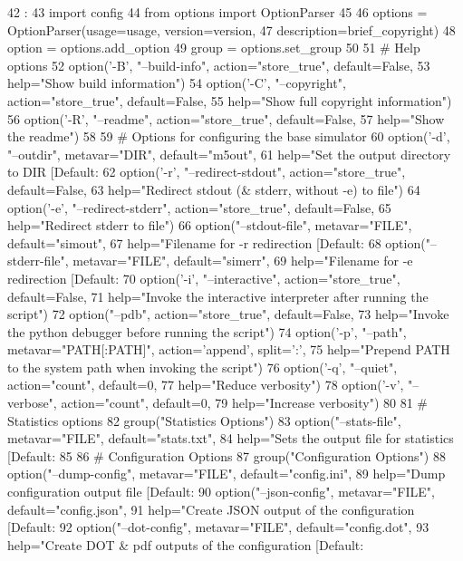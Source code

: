 \begin{DoxyCode}
42                    :
43     import config
44     from options import OptionParser
45 
46     options = OptionParser(usage=usage, version=version,
47                            description=brief_copyright)
48     option = options.add_option
49     group = options.set_group
50 
51     # Help options
52     option('-B', "--build-info", action="store_true", default=False,
53         help="Show build information")
54     option('-C', "--copyright", action="store_true", default=False,
55         help="Show full copyright information")
56     option('-R', "--readme", action="store_true", default=False,
57         help="Show the readme")
58 
59     # Options for configuring the base simulator
60     option('-d', "--outdir", metavar="DIR", default="m5out",
61         help="Set the output directory to DIR [Default: %
62     option('-r', "--redirect-stdout", action="store_true", default=False,
63         help="Redirect stdout (& stderr, without -e) to file")
64     option('-e', "--redirect-stderr", action="store_true", default=False,
65         help="Redirect stderr to file")
66     option("--stdout-file", metavar="FILE", default="simout",
67         help="Filename for -r redirection [Default: %
68     option("--stderr-file", metavar="FILE", default="simerr",
69         help="Filename for -e redirection [Default: %
70     option('-i', "--interactive", action="store_true", default=False,
71         help="Invoke the interactive interpreter after running the script")
72     option("--pdb", action="store_true", default=False,
73         help="Invoke the python debugger before running the script")
74     option('-p', "--path", metavar="PATH[:PATH]", action='append', split=':',
75         help="Prepend PATH to the system path when invoking the script")
76     option('-q', "--quiet", action="count", default=0,
77         help="Reduce verbosity")
78     option('-v', "--verbose", action="count", default=0,
79         help="Increase verbosity")
80 
81     # Statistics options
82     group("Statistics Options")
83     option("--stats-file", metavar="FILE", default="stats.txt",
84         help="Sets the output file for statistics [Default: %
85 
86     # Configuration Options
87     group("Configuration Options")
88     option("--dump-config", metavar="FILE", default="config.ini",
89         help="Dump configuration output file [Default: %
90     option("--json-config", metavar="FILE", default="config.json",
91         help="Create JSON output of the configuration [Default: %
92     option("--dot-config", metavar="FILE", default="config.dot",
93         help="Create DOT & pdf outputs of the configuration [Default: %
      

\end{DoxyCode}

